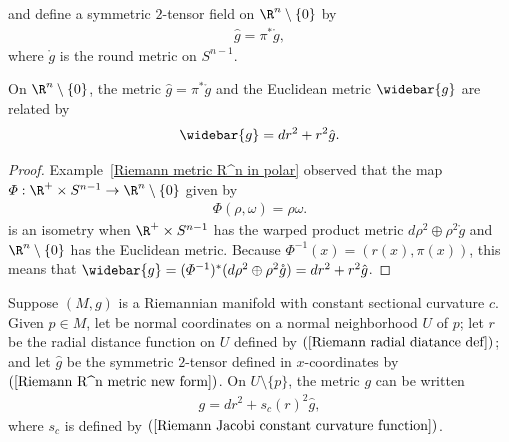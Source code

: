 and define a symmetric $2$-tensor field on $\R^n\setminus\{0\}$ by
\begin{align}\label{Riemann R^n metric new form}
\hat{g}=\pi^*\mathring{g},
\end{align}
where $\mathring{g}$ is the round metric on $S^{n-1}$.
\begin{lemma}
On $\R^n\setminus\{0\}$, the metric $\hat{g}=\pi^*\mathring{g}$ and the Euclidean metric $\widebar{g}$ are related by
\begin{align}\label{Riemann R^n metric into new form}
\widebar{g}=dr^2+r^2\hat{g}.
\end{align}
\end{lemma}
\begin{proof}
Example~\ref{Riemann metric R^n in polar} observed that the map $\varPhi:\R^+\times S^{n-1}\to\R^n\setminus\{0\}$ given by
\begin{align}\label{Riemann R^n metric rounding metric}
\varPhi(\rho,\omega)=\rho\omega.
\end{align}
is an isometry when $\R^+\times S^{n-1}$ has the warped product metric $d\rho^2\oplus\rho^2\mathring{g}$ and $\R^n\setminus\{0\}$ has the Euclidean metric. Because 
$\varPhi^{-1}(x)=(r(x),\pi(x))$, this means that $\widebar{g}=(\varPhi^{-1})^*(d\rho^2\oplus\rho^2\mathring{g})=dr^2+r^2\hat{g}$.
\end{proof}
\begin{theorem}\label{Riemann constant curvature metric in normal coordinate}
Suppose $(M,g)$ is a Riemannian manifold with constant sectional curvature $c$. Given $p\in M$, let be normal coordinates on a normal neighborhood $U$ of $p$; let $r$ 
be the radial distance function on $U$ defined by $(\ref{Riemann radial diatance def})$; and let $\hat{g}$ be the symmetric $2$-tensor defined in $x$-coordinates 
by $(\ref{Riemann R^n metric new form})$. On $U\setminus\{p\}$, the metric $g$ can be written
\begin{align}\label{Riemann constant curvature metric-1}
g=dr^2+s_c(r)^2\hat{g},
\end{align}
where $s_c$ is defined by $(\ref{Riemann Jacobi constant curvature function})$.
\end{theorem}
